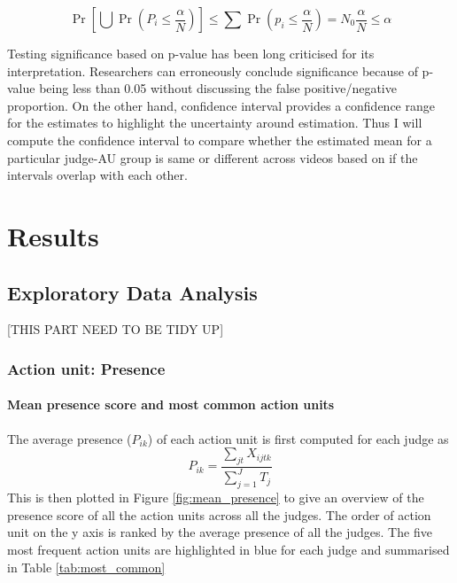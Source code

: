 \documentclass{monashthesis}
\begin{document}
\[\Pr\left[\bigcup \Pr(P_i \le\frac{\alpha}{N})\right] \le \sum \Pr\left(p_i \le \frac{\alpha}{N}\right) = N_0\frac{\alpha}{N} \le \alpha\]

Testing significance based on p-value has been long criticised for its interpretation. Researchers can erroneously conclude significance because of p-value being less than 0.05 without discussing the false positive/negative proportion. On the other hand, confidence interval provides a confidence range for the estimates to highlight the uncertainty around estimation. Thus I will compute the confidence interval to compare whether the estimated mean for a particular judge-AU group is same or different across videos based on if the intervals overlap with each other.

\hypertarget{results}{%
\chapter{Results}\label{results}}

\hypertarget{exploratory-data-analysis}{%
\section{Exploratory Data Analysis}\label{exploratory-data-analysis}}

{[}THIS PART NEED TO BE TIDY UP{]}

\hypertarget{action-unit-presence}{%
\subsection{Action unit: Presence}\label{action-unit-presence}}

\hypertarget{mean-presence-score-and-most-common-action-units}{%
\subsubsection{Mean presence score and most common action units}\label{mean-presence-score-and-most-common-action-units}}

The average presence (\(P_{ik}\)) of each action unit is first computed for each judge as \[P_{ik} = \frac{\sum_{jt}X_{ijtk}}{\sum_{j = 1}^JT_j}\] This is then plotted in Figure \ref{fig:mean_presence} to give an overview of the presence score of all the action units across all the judges. The order of action unit on the y axis is ranked by the average presence of all the judges. The five most frequent action units are highlighted in blue for each judge and summarised in Table \ref{tab:most_common}
\end{document}
